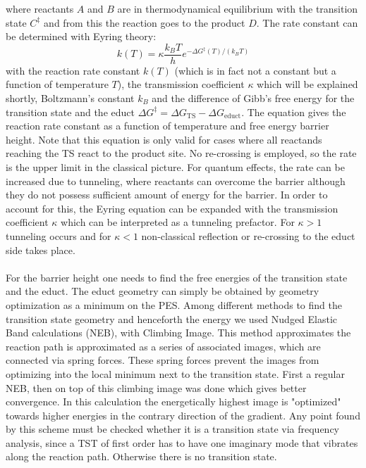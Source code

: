 \documentclass[11pt,DIV=13,BCOR=5mm,a4paper,headinclude]{scrbook}
\begin{document}
where reactants $A$ and $B$ are in thermodynamical equilibrium with the transition state $C^\ddagger$ and from this the reaction goes to the product $D$.
The rate constant can be determined with Eyring theory\cite{eyring,eyring-polanyi}:
\begin{equation}\label{eq:eyring}
k(T)=\kappa\frac{k_BT}{h}e^{-\Delta G^\ddagger(T)/(k_BT)}
\end{equation}
with the reaction rate constant $k(T)$ (which is in fact not a constant but a function of temperature $T$), the transmission coefficient $\kappa$ which will be explained shortly, Boltzmann's constant $k_B$ and the difference of Gibb's free energy for the transition state and the educt $\Delta G^\ddagger = \Delta G_\textrm{TS} - \Delta G_\textrm{educt}$.
The equation gives the reaction rate constant as a function of temperature and free energy barrier height.
Note that this equation is only valid for cases where all reactands reaching the TS react to the product site.
No re-crossing is employed, so the rate is the upper limit in the classical picture.
For quantum effects, the rate can be increased due to tunneling, where reactants can overcome the barrier although they do not possess sufficient amount of energy for the barrier.
In order to account for this, the Eyring equation can be expanded with the transmission coefficient $\kappa$ which can be interpreted as a tunneling prefactor.
For $\kappa>1$ tunneling occurs and for $\kappa<1$ non-classical reflection or re-crossing to the educt side takes place.
\\\\
For the barrier height one needs to find the free energies of the transition state and the educt.
The educt geometry can simply be obtained by geometry optimization as a minimum on the PES.
Among different methods to find the transition state geometry and henceforth the energy we used Nudged Elastic Band calculations (NEB)\cite{Henkelman00a}, with Climbing Image\cite{Henkelman00b}.
This method approximates the reaction path is approximated as a series of associated images, which are connected via spring forces.
These spring forces prevent the images from optimizing into the local minimum next to the transition state.
First a regular NEB, then on top of this climbing image was done which gives better convergence.
In this calculation the energetically highest image is "optimized" towards higher energies in the contrary direction of the gradient.
Any point found by this scheme must be checked whether it is a transition state via frequency analysis, since a TST of first order has to have one imaginary mode that vibrates along the reaction path.
Otherwise there is no transition state.
\end{document}

